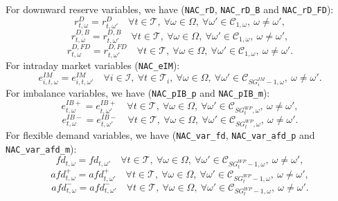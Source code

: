 For downward reserve variables, we have (\verb|NAC_rD|, \verb|NAC_rD_B| and \verb|NAC_rD_FD|):
\begin{equation} \label{EQ:NAC_pVRD1}
	r^D_{t, \omega} = r^D_{t, \omega'} \quad \forall t \in \mathcal{T}, \ \forall \omega \in \Omega, \ \forall \omega' \in \mathcal{C}_{1, \omega}, \ \omega \neq \omega',
\end{equation}
\begin{equation} \label{EQ:NAC_rDB1}
	r^{D, B}_{t, \omega} = r^{D, B}_{t, \omega'} \quad \forall t \in \mathcal{T}, \ \forall \omega \in \Omega, \ \forall \omega' \in \mathcal{C}_{1, \omega}, \ \omega \neq \omega',
\end{equation}
\begin{equation} \label{EQ:NAC_rDFD1}
	r^{D, FD}_{t, \omega} = r^{D, FD}_{t, \omega'} \quad \forall t \in \mathcal{T}, \ \forall \omega \in \Omega, \ \forall \omega' \in \mathcal{C}_{1, \omega}, \ \omega \neq \omega'.
\end{equation}
For intraday market variables (\verb|NAC_eIM|):
\begin{equation} \label{EQ:NAC_mUC1}
	e^{IM}_{i, t, \omega} = e^{IM}_{i, t, \omega'} \quad \forall i \in \mathcal{I}, \ \forall t \in \mathcal{T}_i, \ \forall \omega \in \Omega, \ \forall \omega' \in \mathcal{C}_{SG^{IM}_i -1, \omega}, \ \omega \neq \omega'.
\end{equation}
For imbalance variables, we have (\verb|NAC_pIB_p| and \verb|NAC_pIB_m|):
\begin{equation} \label{EQ:NAC_pPIB1}
	e^{IB+}_{t, \omega} = e^{IB+}_{t, \omega'} \quad \forall t \in \mathcal{T}, \ \forall \omega \in \Omega, \ \forall \omega' \in \mathcal{C}_{SG^{WP}_t, \omega}, \ \omega \neq \omega',
\end{equation}
\begin{equation} \label{EQ:NAC_pNIB1}
	e^{IB-}_{t, \omega} = e^{IB-}_{t, \omega'} \quad \forall t \in \mathcal{T}, \ \forall \omega \in \Omega, \ \forall \omega' \in \mathcal{C}_{SG^{WP}_t, \omega}, \ \omega \neq \omega'.
\end{equation}
For flexible demand variables, we have (\verb|NAC_var_fd|, \verb|NAC_var_afd_p| and  \verb|NAC_var_afd_m|):
\begin{equation} \label{EQ:NAC_var_fd1}
	fd_{t, \omega} = fd_{t, \omega'} \quad \forall t \in \mathcal{T}, \ \forall \omega \in \Omega, \ \forall \omega' \in \mathcal{C}_{SG^{WP}_t - 1, \omega}, \ \omega \neq \omega',
\end{equation}
\begin{equation} \label{EQ:NAC_var_afd_p1}
	afd^+_{t, \omega} = afd^+_{t, \omega'} \quad \forall t \in \mathcal{T}, \ \forall \omega \in \Omega, \ \forall \omega' \in \mathcal{C}_{SG^{WP}_t - 1, \omega}, \ \omega \neq \omega',
\end{equation}
\begin{equation} \label{EQ:NAC_var_afd_m1}
	afd^-_{t, \omega} = afd^-_{t, \omega'} \quad \forall t \in \mathcal{T}, \ \forall \omega \in \Omega, \ \forall \omega' \in \mathcal{C}_{SG^{WP}_t - 1, \omega}, \ \omega \neq \omega'.
\end{equation}

